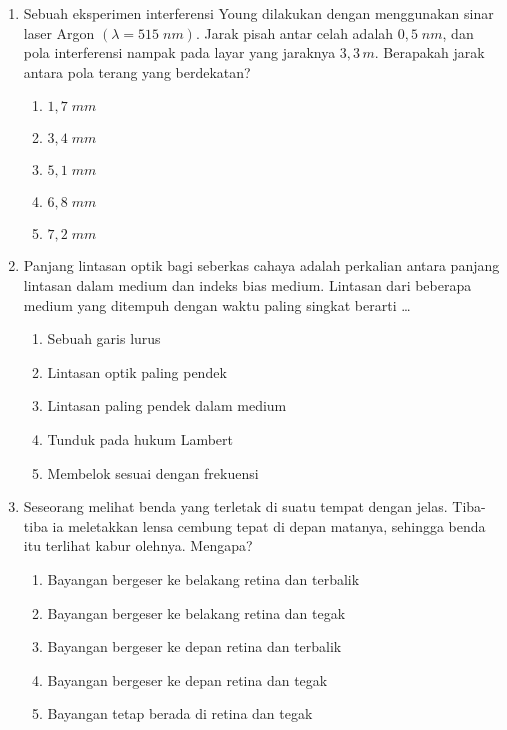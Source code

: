 \documentclass[A4,12PT, english, twocolumn]{journal}
\begin{document}
\begin{enumerate}
\item Sebuah eksperimen interferensi Young dilakukan dengan menggunakan sinar laser Argon $(\lambda=515 \; nm)$. Jarak pisah antar celah adalah $0,5 \; nm$, dan pola interferensi nampak pada layar yang jaraknya $3,3 \, m$. Berapakah jarak antara pola terang yang berdekatan?
    \begin{enumerate}
        \item $1,7 \; mm$
        \item $3,4 \; mm$
        \item $5,1 \; mm$
        \item $6,8 \; mm$
        \item $7,2 \; mm$
    \end{enumerate}

\item Panjang lintasan optik bagi seberkas cahaya adalah perkalian antara panjang lintasan dalam medium dan indeks bias medium. Lintasan dari beberapa medium yang ditempuh dengan waktu paling singkat berarti \dots
    \begin{enumerate}
        \item Sebuah garis lurus
        \item Lintasan optik paling pendek
        \item Lintasan paling pendek dalam medium
        \item Tunduk pada hukum Lambert
        \item Membelok sesuai dengan frekuensi
    \end{enumerate}

\item Seseorang melihat benda yang terletak di suatu tempat dengan jelas. Tiba-tiba ia meletakkan lensa cembung tepat di depan matanya, sehingga benda itu terlihat kabur olehnya. Mengapa?
    \begin{enumerate}
        \item Bayangan bergeser ke belakang retina dan terbalik
        \item Bayangan bergeser ke belakang retina dan tegak
        \item Bayangan bergeser ke depan retina dan terbalik
        \item Bayangan bergeser ke depan retina dan tegak
        \item Bayangan tetap berada di retina dan tegak
    \end{enumerate}


\end{enumerate}
\end{document}
